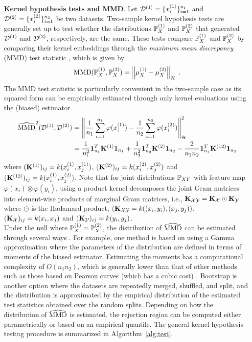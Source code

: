 \textbf{Kernel hypothesis tests and MMD}. Let $\calD^{(1)}=\{\xo_i\}_{i=1}^{n_1}$ and $\calD^{(2)}=\{\xt_i\}_{i=1}^{n_2}$ be two datasets. Two-sample kernel hypothesis tests are generally set up to test whether the distributions $\P_X^{(1)}$ and $\P_X^{(2)}$ that generated $\calD^{(1)}$ and $\calD^{(2)}$, respectively, are the same. These tests compare $\P_X^{(1)}$ and $\P_X^{(2)}$ by comparing their kernel embeddings through the \textit{maximum mean discrepancy} (MMD) test statistic \parencite{Gretton:2012}, which is given by
\[
\MMD(\P_X^{(1)},\P_X^{(2)}) = \left\|\mu_X^{(1)}-\mu_X^{(2)}\right\|_\calH \;.
\]
The MMD test statistic is particularly convenient in the two-sample case as its squared form can be empirically estimated through only kernel evaluations using the (biased) estimator
\begin{align*}
\hatMMD^2(\calD^{(1)},\calD^{(2)}) &= \left\|\frac{1}{n_1}\sum_{i=1}^{n_1}\varphi(\xo_i)-\frac{1}{n_2}\sum_{i=1}^{n_2}\varphi(\xt_i)\right\|_\calH^2 \\
&= \frac{1}{n_1^2}\onevec_{n_1}^T\bfK^{(1)}\onevec_{n_1} + \frac{1}{n_2^2}\onevec_{n_2}^T\bfK^{(2)}\onevec_{n_2} - \frac{2}{n_1n_2}\onevec_{n_1}^T\bfK^{(12)}\onevec_{n_2}
\end{align*}
where $(\bfK^{(1)})_{ij}=k(\xo_i,\xo_j)$, $(\bfK^{(2)})_{ij}=k(\xt_i,\xt_j)$ and $(\bfK^{(12)})_{ij}=k(\xo_i,\xt_j)$. Note that for joint distributions $\P_{XY}$ with feature map $\varphi(x_i)\otimes\varphi(y_i)$, using a product kernel decomposes the joint Gram matrices into element-wise products of marginal Gram matrices, i.e., $\bfK_{\calX\calY} = \bfK_\calX\odot\bfK_\calY$ where $\odot$ is the Hadamard product, $(\bfK_{\calX\calY}=k((x_i,y_i),(x_j,y_j))$, $(\bfK_\calX)_{ij}=k(x_i,x_j)$ and $(\bfK_\calY)_{ij}=k(y_i,y_j)$.
\\

Under the null where $\P_X^{(1)}=\P_X^{(2)}$, the distribution of $\hatMMD$ can be estimated through several ways \parencite{Gretton:2009}. For example, one method is based on using a Gamma approximation where the parameters of the distribution are defined in terms of moments of the biased estimator. Estimating the moments has a computational complexity of $O(n_1n_2)$, which is generally lower than that of other methods such as those based on Pearson curves (which has a cubic cost) \parencite{Gretton:2009}. Bootstrap is another option where the datasets are repeatedly merged, shuffled, and split, and the distribution is approximated by the empirical distribution of the estimated test statistics obtained over the random splits. Depending on how the distribution of $\hatMMD$ is estimated, the rejection region can be computed either parametrically or based on an empirical quantile. The general kernel hypothesis testing procedure is summarized in Algorithm~\ref{alg:test}.
\\

